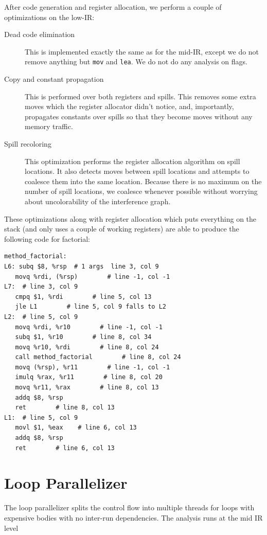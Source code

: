 \documentclass[11pt]{article}
\begin{document}
After code generation and register allocation, we perform a couple of
optimizations on the low-IR:
\begin{description}
\item[Dead code elimination] This is implemented exactly the same as
  for the mid-IR, except we do not remove anything but \texttt{mov}
  and \texttt{lea}.  We do not do any analysis on flags.
\item[Copy and constant propagation] This is performed over both
  registers and spills.  This removes some extra moves which the
  register allocator didn't notice, and, importantly, propagates
  constants over spills so that they become moves without any memory
  traffic.
\item[Spill recoloring] This optimization performs the register
  allocation algorithm on spill locations.  It also detects moves
  between spill locations and attempts to coalesce them into the same
  location.  Because there is no maximum on the number of spill
  locations, we coalesce whenever possible without worrying about
  uncolorability of the interference graph.
\end{description}

These optimizations along with register allocation which puts
everything on the stack (and only uses a couple of working registers)
are able to produce the following code for factorial:
{\footnotesize
\begin{verbatim}
method_factorial:
L6: subq $8, %rsp  # 1 args  line 3, col 9
   movq %rdi, (%rsp)        # line -1, col -1
L7:  # line 3, col 9
   cmpq $1, %rdi        # line 5, col 13
   jle L1        # line 5, col 9 falls to L2
L2:  # line 5, col 9
   movq %rdi, %r10        # line -1, col -1
   subq $1, %r10        # line 8, col 34
   movq %r10, %rdi        # line 8, col 24
   call method_factorial        # line 8, col 24
   movq (%rsp), %r11        # line -1, col -1
   imulq %rax, %r11        # line 8, col 20
   movq %r11, %rax        # line 8, col 13
   addq $8, %rsp
   ret        # line 8, col 13
L1:  # line 5, col 9
   movl $1, %eax    # line 6, col 13
   addq $8, %rsp
   ret        # line 6, col 13
\end{verbatim}
}

\section{Loop Parallelizer}
\label{sec:parallel}

The loop parallelizer splits the control flow into multiple threads
for loops with expensive bodies with no inter-run dependencies. The
analysis runs at the mid IR level 
\end{document}
